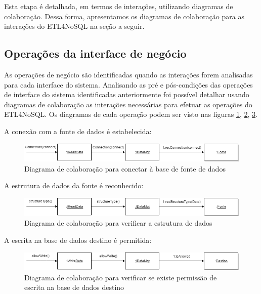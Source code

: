 Esta etapa é detalhada, em termos de interações, utilizando diagramas de colaboração. Dessa forma, apresentamos os diagramas de colaboração para as interações do ETL4NoSQL na seção a seguir.

\subsection{Operações da interface de negócio}

As operações de negócio são identificadas quando as interações forem analisadas para cada interface do sistema. Analisando as pré e pós-condições das operações de interface do sistema identificadas anteriormente foi possível detalhar usando diagramas de colaboração as interações necessárias para efetuar as operações do ETL4NoSQL. Os diagramas de cada operação podem ser visto nas figuras \ref{colaboracao1}, \ref{colaboracao2}, \ref{colaboracao3}.

A conexão com a fonte de dados é estabelecida:

\begin{figure}[h]
	\centering
	\includegraphics[scale=0.5]{fig/colaboracao1.png}
	\caption{Diagrama de colaboração para conectar à base de fonte de dados}
	\label{colaboracao1}
\end{figure}

A estrutura de dados da fonte é reconhecido:

\begin{figure}[h]
	\centering
	\includegraphics[scale=0.5]{fig/colaboracao2.png}
	\caption{Diagrama de colaboração para verificar a estrutura de dados}
	\label{colaboracao2}
\end{figure}

A escrita na base de dados destino é permitida:

\begin{figure}[h]
	\centering
	\includegraphics[scale=0.5]{fig/colaboracao3.png}
	\caption{Diagrama de colaboração para verificar se existe permissão de escrita na base de dados destino}
	\label{colaboracao3}
\end{figure}



